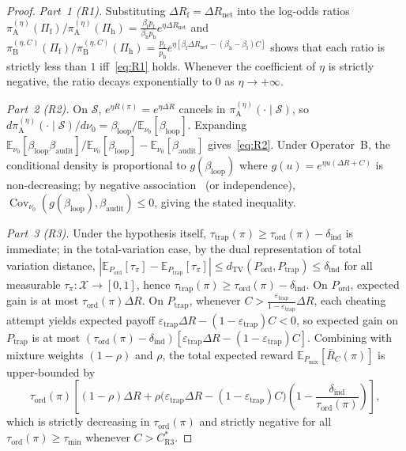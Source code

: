 \documentclass[11pt,a4paper]{article}
\newcommand{\E}{\mathbb{E}}
\newcommand{\Cov}{\operatorname{Cov}}
\newcommand{\dTV}{d_{\mathrm{TV}}}
\begin{document}
\begin{proof}
\emph{Part~1 (R1).} Substituting $\Delta R_{\mathrm{f}} = \Delta R_{\mathrm{net}}$ into the log-odds ratios $\pi_{\mathrm{A}}^{(\eta)}(\Pi_{\mathrm{f}})/\pi_{\mathrm{A}}^{(\eta)}(\Pi_{\mathrm{h}}) = \frac{\beta_{\mathrm{f}} p_{\mathrm{f}}}{\beta_{\mathrm{h}} p_{\mathrm{h}}} e^{\eta \Delta R_{\mathrm{net}}}$ and $\pi_{\mathrm{B}}^{(\eta, C)}(\Pi_{\mathrm{f}})/\pi_{\mathrm{B}}^{(\eta, C)}(\Pi_{\mathrm{h}}) = \frac{p_{\mathrm{f}}}{p_{\mathrm{h}}} e^{\eta[\beta_{\mathrm{f}}\Delta R_{\mathrm{net}} - (\beta_{\mathrm{h}}-\beta_{\mathrm{f}})C]}$ shows that each ratio is strictly less than $1$ iff~\eqref{eq:R1} holds. Whenever the coefficient of $\eta$ is strictly negative, the ratio decays exponentially to $0$ as $\eta \to +\infty$.

\emph{Part~2 (R2).} On $\mathcal{S}$, $e^{\eta R(\pi)} = e^{\eta \Delta R}$ cancels in $\pi_{\mathrm{A}}^{(\eta)}(\cdot \mid \mathcal{S})$, so $d\pi_{\mathrm{A}}^{(\eta)}(\cdot \mid \mathcal{S})/d\nu_0 = \beta_{\mathrm{loop}} / \E_{\nu_0}[\beta_{\mathrm{loop}}]$. Expanding $\E_{\nu_0}[\beta_{\mathrm{loop}}\beta_{\mathrm{audit}}]/\E_{\nu_0}[\beta_{\mathrm{loop}}] - \E_{\nu_0}[\beta_{\mathrm{audit}}]$ gives~\eqref{eq:R2}. Under Operator~B, the conditional density is proportional to $g(\beta_{\mathrm{loop}})$ where $g(u) = e^{\eta u (\Delta R + C)}$ is non-decreasing; by negative association~\cite{joagdev1983} (or independence), $\Cov_{\nu_0}(g(\beta_{\mathrm{loop}}), \beta_{\mathrm{audit}}) \le 0$, giving the stated inequality.

\emph{Part~3 (R3).} Under the hypothesis itself, $\tau_{\mathrm{trap}}(\pi) \ge \tau_{\mathrm{ord}}(\pi) - \delta_{\mathrm{ind}}$ is immediate; in the total-variation case, by the dual representation of total variation distance, $|\E_{P_{\mathrm{ord}}}[\tau_\pi] - \E_{P_{\mathrm{trap}}}[\tau_\pi]| \le \dTV(P_{\mathrm{ord}}, P_{\mathrm{trap}}) \le \delta_{\mathrm{ind}}$ for all measurable $\tau_\pi : \mathcal{X} \to [0, 1]$, hence $\tau_{\mathrm{trap}}(\pi) \ge \tau_{\mathrm{ord}}(\pi) - \delta_{\mathrm{ind}}$. On $P_{\mathrm{ord}}$, expected gain is at most $\tau_{\mathrm{ord}}(\pi)\Delta R$. On $P_{\mathrm{trap}}$, whenever $C > \frac{\varepsilon_{\mathrm{trap}}}{1-\varepsilon_{\mathrm{trap}}}\Delta R$, each cheating attempt yields expected payoff $\varepsilon_{\mathrm{trap}}\Delta R - (1-\varepsilon_{\mathrm{trap}})C < 0$, so expected gain on $P_{\mathrm{trap}}$ is at most $(\tau_{\mathrm{ord}}(\pi) - \delta_{\mathrm{ind}})[\varepsilon_{\mathrm{trap}}\Delta R - (1-\varepsilon_{\mathrm{trap}})C]$. Combining with mixture weights $(1-\rho)$ and $\rho$, the total expected reward $\E_{P_{\mathrm{mix}}}[\bar{R}_C(\pi)]$ is upper-bounded by
\[
  \tau_{\mathrm{ord}}(\pi)\left[(1-\rho)\Delta R + \rho\big(\varepsilon_{\mathrm{trap}}\Delta R - (1-\varepsilon_{\mathrm{trap}})C\big)\left(1 - \frac{\delta_{\mathrm{ind}}}{\tau_{\mathrm{ord}}(\pi)}\right)\right],
\]
which is strictly decreasing in $\tau_{\mathrm{ord}}(\pi)$ and strictly negative for all $\tau_{\mathrm{ord}}(\pi) \ge \tau_{\min}$ whenever $C > C_{\mathrm{R3}}^*$.
\end{proof}
\end{document}
